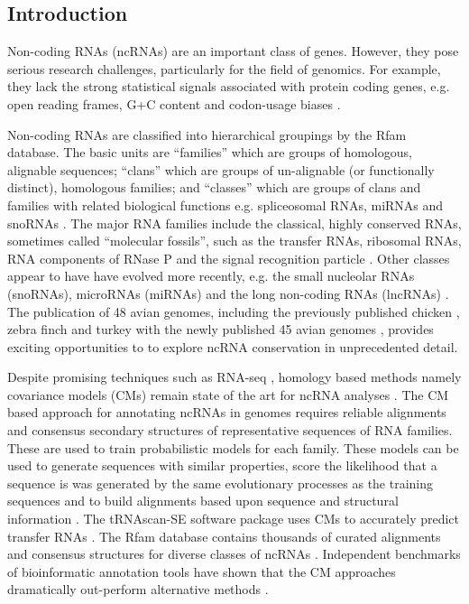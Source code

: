 \documentclass[10pt]{bmc_article}
\newenvironment{bmcformat}{\begin{raggedright}\baselineskip20pt\sloppy\setboolean{publ}{false}}{\end{raggedright}\baselineskip20pt\sloppy}
\begin{document}
\begin{bmcformat}



\section*{Introduction}

Non-coding RNAs (ncRNAs) are an important class of genes. However,
they pose serious research challenges, particularly for the field of
genomics. For example, they lack the strong statistical signals
associated with protein coding genes, e.g. open reading frames, G+C
content and codon-usage biases \cite{Rivas:2000}.

Non-coding RNAs are classified into hierarchical groupings by the Rfam
database. The basic units are ``families'' which are groups of
homologous, alignable sequences; ``clans'' which are groups of
un-alignable (or functionally distinct), homologous families; and
``classes'' which are groups of clans and families with related
biological functions e.g. spliceosomal RNAs, miRNAs and snoRNAs
\cite{Griffiths-Jones:2003,Griffiths-Jones:2005,Gardner:2009,Gardner:2011a,Burge:2013}.
The major RNA families include the classical, highly conserved RNAs,
sometimes called ``molecular fossils'', such as the transfer RNAs,
ribosomal RNAs, RNA components of RNase P and the signal recognition
particle \cite{Jeffares:1998}. Other classes appear to have have
evolved more recently, e.g. the small nucleolar RNAs (snoRNAs),
microRNAs (miRNAs) and the long non-coding RNAs (lncRNAs)
\cite{Hoeppner:2012}. The publication of 48 avian genomes, including
the previously published chicken
\cite{International_Chicken_Genome_Sequencing_Consortium:2004}, zebra
finch \cite{Warren:2010} and turkey \cite{Dalloul:2010} with the newly
published 45 avian genomes \cite{}, provides exciting opportunities to
to explore ncRNA conservation in unprecedented detail.


Despite promising techniques such as RNA-seq \cite{Croucher:2010},
homology based methods namely covariance models (CMs) remain state of the
art for ncRNA analyses \cite{Sakakibara:1994,Eddy:1994,Nawrocki:2009}.
The CM based approach for annotating ncRNAs in genomes requires
reliable alignments and consensus secondary structures of
representative sequences of RNA families. These are used to train
probabilistic models for each family. These models can be used to
generate sequences with similar properties, score the likelihood that
a sequence is was generated by the same evolutionary processes as the
training sequences and to build alignments based upon sequence and
structural information \cite{Sakakibara:1994,Eddy:1994,Nawrocki:2009}.
The tRNAscan-SE software package uses CMs to accurately predict
transfer RNAs \cite{Lowe:1997,Chan:2009}. The Rfam database contains
thousands of curated alignments and consensus structures for diverse
classes of ncRNAs
\cite{Griffiths-Jones:2003,Griffiths-Jones:2005,Gardner:2009,Gardner:2011a,Burge:2013}.
Independent benchmarks of bioinformatic annotation tools have shown
that the CM approaches dramatically out-perform alternative methods
\cite{Freyhult:2007}.


\end{bmcformat}
\end{document}
